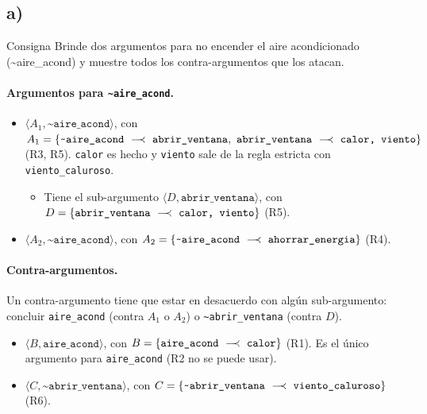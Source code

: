 \documentclass[11pt,a4paper]{article}
\newcommand{\nf}{\textasciitilde}                 %
\newcommand{\reb}{\mathrel{-\!\!\!\prec}}         %
\newcommand{\regla}[3]{\text{\texttt{#1}}~\ensuremath{#2}~\text{\texttt{#3}}}
\begin{document}
\clearpage
\subsection{a)}

\begin{enunciado}{Consigna}
Brinde dos argumentos para no encender el aire acondicionado (\nf aire\_acond) y muestre todos los contra-argumentos que los atacan.
\end{enunciado}

\paragraph{Argumentos para \texttt{\nf aire\_acond}.}
\begin{itemize}
  \item $\langle A_1, \texttt{\nf aire\_acond}\rangle$, con $A_1 = \{\regla{\nf aire\_acond}{\reb}{abrir\_ventana},\ \regla{abrir\_ventana}{\reb}{calor, viento}\}$ (R3, R5). \texttt{calor} es hecho y \texttt{viento} sale de la regla estricta con \texttt{viento\_caluroso}.
  \begin{itemize}
    \item Tiene el sub-argumento $\langle D, \texttt{abrir\_ventana}\rangle$, con $D = \{\regla{abrir\_ventana}{\reb}{calor, viento}\}$ (R5).
  \end{itemize}
  \item $\langle A_2, \texttt{\nf aire\_acond}\rangle$, con $A_2 = \{\regla{\nf aire\_acond}{\reb}{ahorrar\_energia}\}$ (R4).
\end{itemize}

\paragraph{Contra-argumentos.} Un contra-argumento tiene que estar en desacuerdo con algún sub-argumento: concluir \texttt{aire\_acond} (contra $A_1$ o $A_2$) o \texttt{\nf abrir\_ventana} (contra $D$).
\begin{itemize}
  \item $\langle B, \texttt{aire\_acond}\rangle$, con $B = \{\regla{aire\_acond}{\reb}{calor}\}$ (R1). Es el único argumento para \texttt{aire\_acond} (R2 no se puede usar).
  \item $\langle C, \texttt{\nf abrir\_ventana}\rangle$, con $C = \{\regla{\nf abrir\_ventana}{\reb}{viento\_caluroso}\}$ (R6).
\end{itemize}
\end{document}

